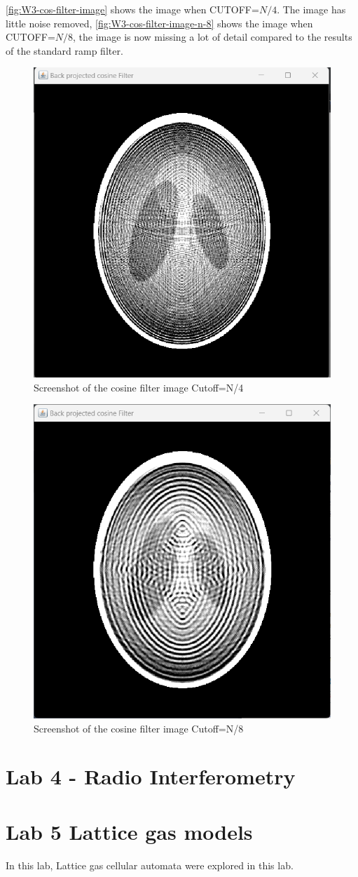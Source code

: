 \autoref{fig:W3-cos-filter-image} shows the image when CUTOFF=$N/4$. The image has little noise removed,
\autoref{fig:W3-cos-filter-image-n-8} shows the image when CUTOFF=$N/8$, the image is now missing a lot of detail compared to the results of the standard ramp filter. 
\begin{figure}[H] 
    \centering
    \includegraphics[width=0.49\columnwidth]{Figures/Week 3/filter-cos-image.png}
    \caption{Screenshot of the cosine filter image Cutoff=N/4}
    \label{fig:W3-cos-filter-image}
\end{figure}
\begin{figure}[H] 
    \centering
    \includegraphics[width=0.49\columnwidth]{Figures/Week 3/filter-cos-image-N-8.png}
    \caption{Screenshot of the cosine filter image Cutoff=N/8}
    \label{fig:W3-cos-filter-image-n-8}
\end{figure}


\newpage
\section{Lab 4 - Radio Interferometry}


\newpage
\section{Lab 5 Lattice gas models}
In this lab, Lattice gas cellular automata were explored in this lab.




